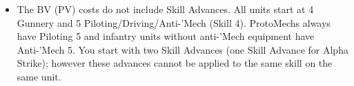 \begin{itemize}
\begin{table}[!h]
    \caption*{Support Unit Requirements}
  \end{table}

  \item The BV (PV) costs do not include Skill Advances.
    All units start at 4 Gunnery and 5 Piloting/Driving/Anti-'Mech (Skill 4).
    ProtoMechs always have Piloting 5 and infantry units without anti-'Mech equipment have Anti-'Mech 5.
    You start with two Skill Advances (one Skill Advance for Alpha Strike); however these advances cannot be applied to the same skill on the same unit.

\end{itemize}
